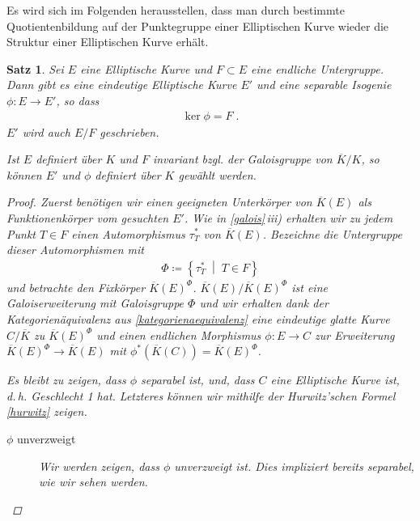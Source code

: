 \documentclass[english, german, parskip=half]{scrartcl}
\newtheorem{Satz}{Satz}[section]
\theoremstyle{definition}
\theoremstyle{remark}
\newcommand*{\K}{\ensuremath{K}} %
\newcommand*{\algK}{\ensuremath{\overline K}} %
\newcommand{\F}{F} %
\begin{document}
Es wird sich im Folgenden herausstellen, dass man durch bestimmte
Quotientenbildung auf der Punktegruppe einer Elliptischen Kurve wieder
die Struktur einer Elliptischen Kurve erhält.

\begin{Satz}
  Sei $E$ eine Elliptische Kurve und $\F\subset E$ eine endliche
  Untergruppe.
  Dann gibt es eine eindeutige Elliptische Kurve $E'$ und eine
  separable Isogenie $\phi\colon E\to E'$, so dass
  \begin{gather*}
    \ker\phi = \F \;.
  \end{gather*}
  $E'$ wird auch $E/\F$ geschrieben.

  Ist $E$ definiert über $K$ und $\F$ invariant bzgl. der Galoisgruppe
  von $\algK/\K$, so können $E'$ und $\phi$ definiert über $K$ gewählt
  werden.
  \begin{proof}
    Zuerst benötigen wir einen geeigneten Unterkörper von $\algK(E)$
    als Funktionenkörper vom gesuchten $E'$.
    Wie in \autoref{galois}\,\emph{iii)} erhalten wir zu jedem Punkt
    $T\in \F$ einen Automorphismus $\tau_T^*$ von $\algK(E)$.
    Bezeichne die Untergruppe dieser Automorphismen mit 
    \begin{gather*}
      \Phi\coloneqq\left\{ \tau_T^* \;\middle|\; T\in \F \right\}
    \end{gather*}
    und betrachte den Fixkörper $\algK(E)^\Phi$.    
    $\algK(E)/\algK(E)^\Phi$ ist eine Galoiserweiterung mit
    Galoisgruppe $\Phi$ und wir erhalten dank der Kategorienäquivalenz
    aus \autoref{kategorienaequivalenz} eine eindeutige glatte Kurve
    $C/\algK$ zu $\algK(E)^\Phi$ und einen endlichen Morphismus
    $\phi\colon E\to C$ zur Erweiterung $\algK(E)^\Phi\to\algK(E)$
    mit $\phi^*(\algK(C))=\algK(E)^\Phi$.
    
    Es bleibt zu zeigen, dass $\phi$ separabel ist, und, dass $C$ eine
    Elliptische Kurve ist, d.\,h. Geschlecht 1 hat.
    Letzteres können wir mithilfe der Hurwitz'schen Formel
    \autoref{hurwitz} zeigen.

    \begin{description}
    \item[$\phi$ unverzweigt]
      Wir werden zeigen, dass $\phi$ unverzweigt ist. Dies impliziert
      bereits separabel, wie wir sehen werden.


\end{description}
\end{proof}
\end{Satz}
\end{document}
